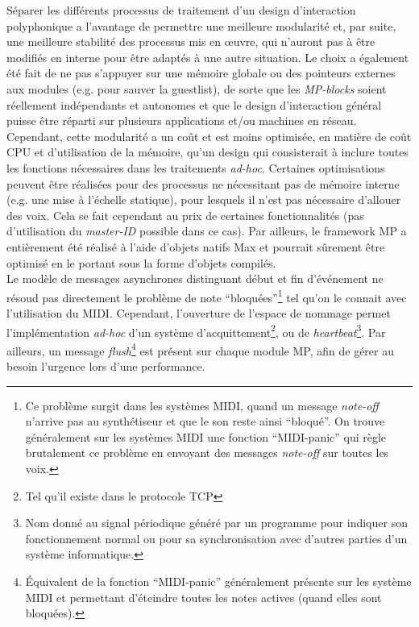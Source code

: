 \noindent Séparer les différents processus de traitement d'un design d'interaction polyphonique a l'avantage de permettre une meilleure modularité et, par suite, une meilleure stabilité des processus mis en œuvre, qui n'auront pas à être modifiés en interne pour être adaptés à une autre situation. Le choix a également été fait de ne pas s'appuyer sur une mémoire globale ou des pointeurs externes aux modules (e.g. pour sauver la guestlist), de sorte que les \textit{MP-blocks} soient réellement indépendants et autonomes et que le design d'interaction général puisse être réparti sur plusieurs applications et/ou machines en réseau.\\
\indent Cependant, cette modularité a un coût et est moins optimisée, en matière de coût \gls{CPU} et d'utilisation de la mémoire, qu'un design qui consisterait à inclure toutes les fonctions nécessaires dans les traitements \textit{ad-hoc}. Certaines optimisations peuvent être réalisées pour des processus ne nécessitant pas de mémoire interne (e.g. une mise à l'échelle statique), pour lesquels il n'est pas nécessaire d'allouer des voix. Cela se fait cependant au prix de certaines fonctionnalités (pas d'utilisation du \textit{master-ID} possible dans ce cas). Par ailleurs, le framework MP a entièrement été réalisé à l'aide d'objets natifs Max et pourrait sûrement être optimisé en le portant sous la forme d'objets compilés.\\
\indent Le modèle de messages asynchrones distinguant début et fin d'événement ne résoud pas directement le problème de note ``bloquées''\footnote{Ce problème surgit dans les systèmes MIDI, quand un message \textit{note-off} n'arrive pas au synthétiseur et que le son reste ainsi ``bloqué''. On trouve généralement sur les systèmes MIDI une fonction ``MIDI-panic'' qui règle brutalement ce problème en envoyant des messages \textit{note-off} sur toutes les voix.} tel qu'on le connait avec l'utilisation du \gls{MIDI}. Cependant, l'ouverture de l'espace de nommage permet l'implémentation \textit{ad-hoc} d'un système d'acquittement\footnote{Tel qu'il existe dans le protocole \gls{TCP}}, ou de \textit{heartbeat}\footnote{Nom donné au signal périodique généré par un programme pour indiquer son fonctionnement normal ou pour sa synchronisation avec d'autres parties d'un système informatique.}. Par ailleurs, un message \textit{flush}\footnote{Équivalent de la fonction ``MIDI-panic'' généralement présente sur les système MIDI et permettant d'éteindre toutes les notes actives (quand elles sont bloquées).} est présent sur chaque module MP, afin de gérer au besoin l'urgence lors d'une performance.


